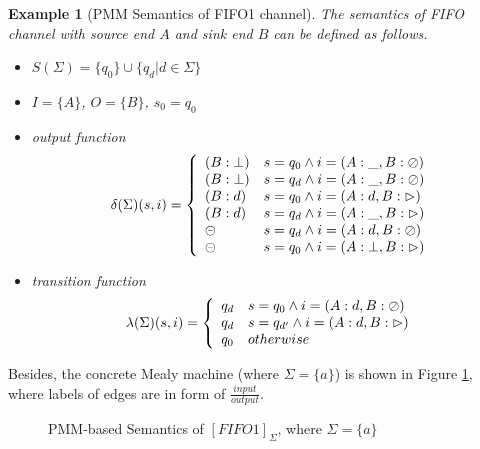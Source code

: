 \documentclass[conference, a4paper]{IEEEtran}
\newtheorem{example}{Example}
\newcommand{\rblock}[0]{\circleddash}
\newcommand{\rread}[0]{\rhd}
\newcommand{\rnoread}[0]{\oslash}
\newcommand{\smap}[1]{[{#1}]}
\begin{document}
\begin{example}[PMM Semantics of FIFO1 channel]
  \label{example:pmmfifo}
  The semantics of FIFO channel with source end $A$ and sink end $B$ can be defined as follows.
  \begin{itemize}
    \item[-] $S(\Sigma)=\{q_0\}\cup\{q_d|d\in\Sigma\}$
    \item[-] $I=\{A\}$, $O=\{B\}$, $s_0=q_0$
    \item[-] output function
      \begin{displaymath}
        \delta(\Sigma)(s,i)=\left\{
        \begin{array}[ht]{ll}
          (B:\bot) & s=q_0\land i=(A:\_,B:\rnoread) \\
          (B:\bot) & s=q_d\land i=(A:\_,B:\rnoread) \\     
          (B:d) & s=q_0\land i=(A:d,B:\rread)\\
          (B:d) & s=q_d\land i=(A:\_,B:\rread)\\
          \rblock & s=q_d\land i=(A:d,B:\rnoread) \\
          \rblock & s=q_0\land i=(A:\bot,B:\rread) \\
        \end{array}
        \right.
      \end{displaymath}
    \item[-] transition function
      \begin{displaymath}
        \lambda(\Sigma)(s,i)=\left\{
        \begin{array}[ht]{ll}
          q_d & s=q_0\land i=(A:d,B:\rnoread) \\
          q_d & s=q_{d'}\land i=(A:d,B:\rread) \\
          q_0 & otherwise \\
        \end{array}
        \right.
      \end{displaymath}
  \end{itemize}
\end{example}

Besides, the concrete Mealy machine (where $\Sigma=\{a\}$) is shown in Figure \ref{fig:pmmfifo},
where labels of edges are in form of $\frac{input}{output}$.
\begin{figure}[ht]
  \begin{center}
    
  \end{center}
  \caption{PMM-based Semantics of $\smap{FIFO1}_\Sigma$, where $\Sigma=\{a\}$}
  \label{fig:pmmfifo}
\end{figure}
\end{document}
